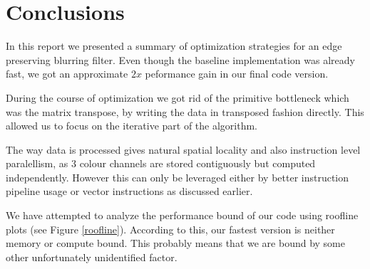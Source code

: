 \section{Conclusions}

In this report we presented a summary of optimization strategies for an edge preserving blurring filter. Even though the baseline implementation was already fast, we got an approximate $2x$ peformance gain in our final code version.

During the course of optimization we got rid of the primitive bottleneck which was the matrix transpose, by writing the data in transposed fashion directly. This allowed us to focus on the iterative part of the algorithm.

The way data is processed gives natural spatial locality and also instruction level paralellism, as 3 colour channels are stored contiguously but computed independently. However this can only be leveraged either by better instruction pipeline usage or vector instructions as discussed earlier. 

We have attempted to analyze the performance bound of our code using roofline plots (see Figure \ref{roofline}). According to this, our fastest version is neither memory or compute bound. This probably means that we are bound by some other unfortunately unidentified factor. 

